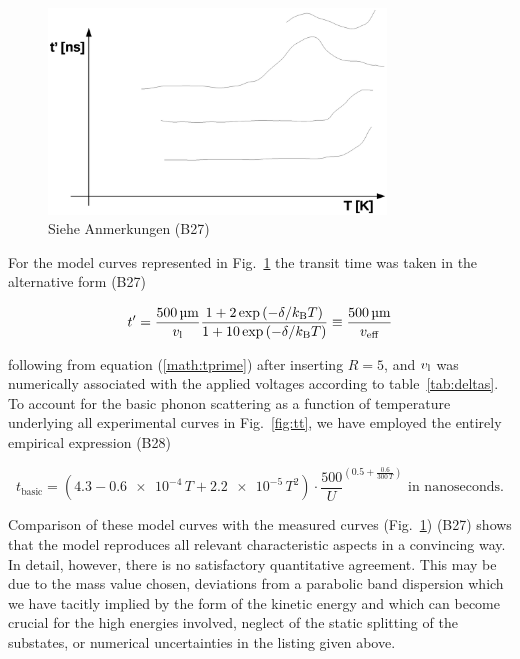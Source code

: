 \begin{figure}[tb]
 \centering
 \includegraphics[trim=0 150 0 0, width=0.80\textwidth]{figures/dummy_repop.eps}
 \caption{Siehe Anmerkungen {\color{red}(B27)}}
 \label{fig:repop}
\end{figure}


For the model curves represented in Fig.~\ref{fig:repop}  the transit time was taken in the alternative form {\color{red}(B27)}

\begin{equation}
 t' = \frac{\SI{500}{\um}}{\vl}\frac{1+2\exp{(-\delta/\kB T)}}{1+10\exp{(-\delta/\kB T)}} \equiv \frac{\SI{500}{\um}}{v_{\textrm{eff}}}
\end{equation}

\noindent
following from equation (\ref{math:tprime}) after inserting $R = 5$, and $v_{\textrm{l}}$ was numerically associated with the applied voltages according to table~\ref{tab:deltas}.
To account for the basic phonon scattering as a function of temperature underlying all experimental curves in Fig.~\ref{fig:tt}, we have employed the entirely empirical expression {\color{red}(B28)}

\begin{equation}
 t_{\textrm{basic}} = \left( 4.3 - \num{0.6e-4}\,T + \num{2.2e-5}\,T^2 \right) \cdot \frac{500}{U} ^{\left( 0.5 + \frac{0.6}{300\,T} \right)} \textrm{ in nanoseconds}.
\end{equation}

\noindent
Comparison of these model curves with the measured curves (Fig.~\ref{fig:repop}) {\color{red}(B27)} shows that the model reproduces all relevant characteristic aspects in a convincing way. 
In detail, however, there is no satisfactory quantitative agreement. 
This may be due to the mass value chosen, deviations from a parabolic band dispersion which we have tacitly implied by the form of the kinetic energy and which can become crucial for the high energies involved,
 neglect of the static splitting of the substates, or numerical uncertainties in the listing given above.


